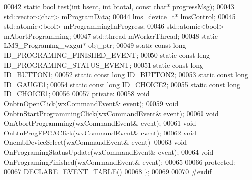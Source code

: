 \begin{DoxyCode}
00042     \textcolor{keyword}{static} \textcolor{keywordtype}{bool} test(\textcolor{keywordtype}{int} bsent, \textcolor{keywordtype}{int} btotal, \textcolor{keyword}{const} \textcolor{keywordtype}{char}* progressMsg);
00043     std::vector<char> mProgramData;
00044     lms_device_t* lmsControl;
00045     std::atomic<bool> mProgrammingInProgress;
00046     std::atomic<bool> mAbortProgramming;
00047     std::thread mWorkerThread;
00048     \textcolor{keyword}{static} LMS_Programing_wxgui* obj_ptr;
00049     \textcolor{keyword}{static} \textcolor{keyword}{const} \textcolor{keywordtype}{long} ID_PROGRAMING_FINISHED_EVENT;
00050     \textcolor{keyword}{static} \textcolor{keyword}{const} \textcolor{keywordtype}{long} ID_PROGRAMING_STATUS_EVENT;
00051     \textcolor{keyword}{static} \textcolor{keyword}{const} \textcolor{keywordtype}{long} ID_BUTTON1;
00052     \textcolor{keyword}{static} \textcolor{keyword}{const} \textcolor{keywordtype}{long} ID_BUTTON2;
00053     \textcolor{keyword}{static} \textcolor{keyword}{const} \textcolor{keywordtype}{long} ID_GAUGE1;
00054     \textcolor{keyword}{static} \textcolor{keyword}{const} \textcolor{keywordtype}{long} ID_CHOICE2;
00055     \textcolor{keyword}{static} \textcolor{keyword}{const} \textcolor{keywordtype}{long} ID_CHOICE1;
00056 
00057 \textcolor{keyword}{private}:
00058     \textcolor{keywordtype}{void} OnbtnOpenClick(wxCommandEvent& event);
00059     \textcolor{keywordtype}{void} OnbtnStartProgrammingClick(wxCommandEvent& event);
00060     \textcolor{keywordtype}{void} OnAbortProgramming(wxCommandEvent& event);
00061     \textcolor{keywordtype}{void} OnbtnProgFPGAClick(wxCommandEvent& event);
00062     \textcolor{keywordtype}{void} OncmbDeviceSelect(wxCommandEvent& event);
00063     \textcolor{keywordtype}{void} OnProgramingStatusUpdate(wxCommandEvent& event);
00064     \textcolor{keywordtype}{void} OnProgramingFinished(wxCommandEvent& event);
00065 
00066 \textcolor{keyword}{protected}:
00067     DECLARE\_EVENT\_TABLE()
00068 \};
00069 
00070 \textcolor{preprocessor}{#endif}
\end{DoxyCode}
